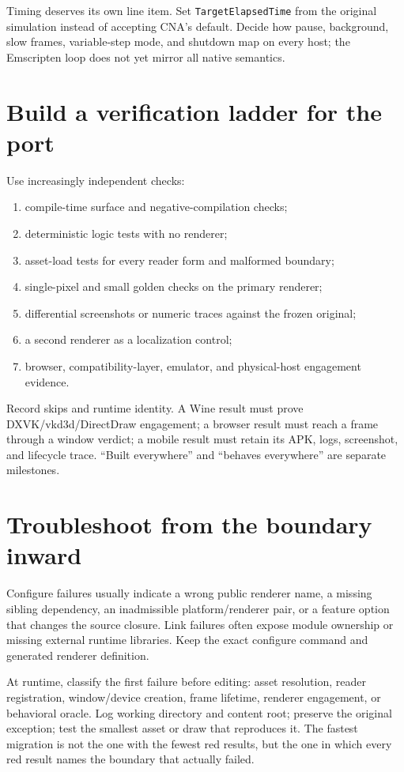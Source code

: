 Timing deserves its own line item.  Set \texttt{TargetElapsedTime} from the original simulation
instead of accepting CNA's default.  Decide how pause, background, slow frames, variable-step mode,
and shutdown map on every host; the Emscripten loop does not yet mirror all native semantics.

\section{Build a verification ladder for the port}

Use increasingly independent checks:

\begin{enumerate}
  \item compile-time surface and negative-compilation checks;
  \item deterministic logic tests with no renderer;
  \item asset-load tests for every reader form and malformed boundary;
  \item single-pixel and small golden checks on the primary renderer;
  \item differential screenshots or numeric traces against the frozen original;
  \item a second renderer as a localization control;
  \item browser, compatibility-layer, emulator, and physical-host engagement evidence.
\end{enumerate}

Record skips and runtime identity.  A Wine result must prove DXVK/vkd3d/DirectDraw engagement; a
browser result must reach a frame through a window verdict; a mobile result must retain its APK,
logs, screenshot, and lifecycle trace.  ``Built everywhere'' and ``behaves everywhere'' are
separate milestones.

\section{Troubleshoot from the boundary inward}

Configure failures usually indicate a wrong public renderer name, a missing sibling dependency,
an inadmissible platform/renderer pair, or a feature option that changes the source closure.  Link
failures often expose module ownership or missing external runtime libraries.  Keep the exact
configure command and generated renderer definition.

At runtime, classify the first failure before editing: asset resolution, reader registration,
window/device creation, frame lifetime, renderer engagement, or behavioral oracle.  Log working
directory and content root; preserve the original exception; test the smallest asset or draw that
reproduces it.  The fastest migration is not the one with the fewest red results, but the one in
which every red result names the boundary that actually failed.
